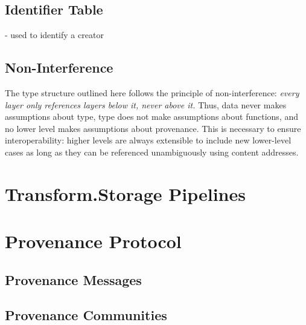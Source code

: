 \documentclass[9pt, oneside]{article}   	%
\begin{document}
\label{builtInFunctions}
\setlength{\parindent}{.5 cm}
\begin{multicols}{2}
\vspace{.25 cm}

\subsection{Identifier Table}\label{transformID}
- used to identify a creator

\subsection{Non-Interference}\label{nonInterference}
The type structure outlined here follows the principle of non-interference: \textit{every layer only references layers below it, never above it.} Thus, data never makes assumptions about type, type does not make assumptions about functions, and no lower level makes assumptions about provenance. This is necessary to ensure interoperability: higher levels are always extensible to include new lower-level cases as long as they can be referenced unambiguously using content addresses. 

\section{Transform.Storage Pipelines}\label{transformpipes}

\section{Provenance Protocol}\label{provprotocol}

\subsection{Provenance Messages}\label{provMessages}

\subsection{Provenance Communities}\label{provCommunities}





\end{multicols}
\end{document}
